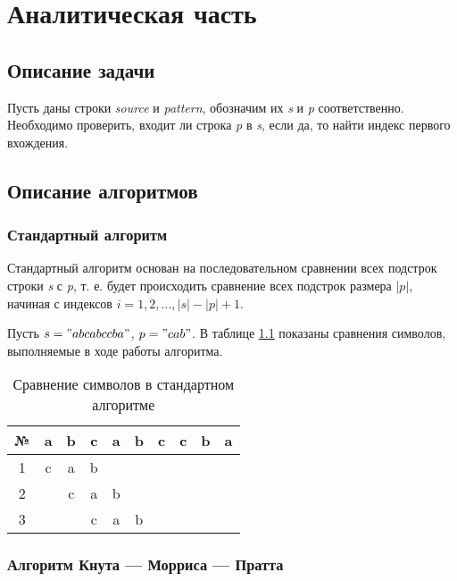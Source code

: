 \chapter{Аналитическая часть}

\section{Описание задачи}

Пусть даны строки \textit{source} и \textit{pattern}, обозначим их \textit{s} и \textit{p} соответственно.
Необходимо проверить, входит ли строка \textit{p} в \textit{s}, если да, то найти индекс первого вхождения.

\section{Описание алгоритмов}

\subsection{Стандартный алгоритм}

Стандартный алгоритм основан на последовательном сравнении всех подстрок строки \textit{s} с \textit{p}, т. е. будет происходить сравнение всех подстрок размера $|p|$, начиная с индексов $i = 1,2,...,|s|-|p|+1$.

Пусть $s= "abcabccba"$, $p = "cab"$.
В таблице \ref{tbl:standard-analysis} показаны сравнения символов, выполняемые в ходе работы алгоритма.

\begin{table}[h]
	\label{tbl:standard-analysis}
	\begin{center}
		\begin{tabular}{|c|c|c|c|c|c|c|c|c|c|}
			\hline
			№&a&b&c&a&b&c&c&b&a\\
			\hline
			1&c&a&b& & & & & &\\
			\hline
			2& &c&a&b& & & & &\\
			\hline
			3& & &c&a&b& & & &\\
			\hline
		\end{tabular}
	\end{center}
	\caption{Сравнение символов в стандартном алгоритме}
\end{table}

\subsection{Алгоритм Кнута — Морриса — Пратта}

